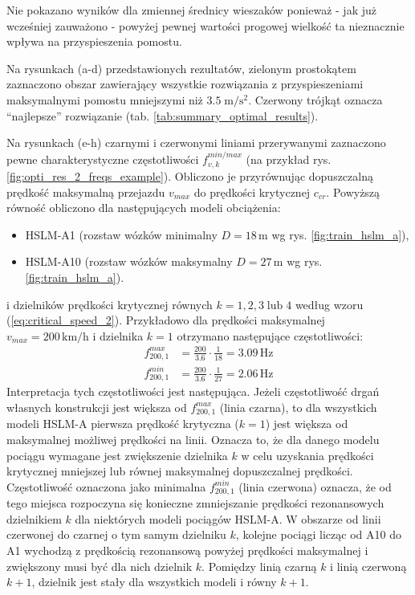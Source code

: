 Nie pokazano wyników dla zmiennej średnicy wieszaków ponieważ - jak już wcześniej zauważono - powyżej pewnej wartości progowej wielkość ta nieznacznie wpływa na przyspieszenia pomostu. 

Na rysunkach (a-d) przedstawionych rezultatów, zielonym prostokątem zaznaczono obszar zawierający wszystkie rozwiązania z przyspieszeniami maksymalnymi pomostu mniejszymi niż $3.5\;\mathrm{m/s^2}$. Czerwony trójkąt oznacza \enquote{najlepsze} rozwiązanie (tab. \ref{tab:summary_optimal_results}).

Na rysunkach (e-h) czarnymi i czerwonymi liniami przerywanymi zaznaczono pewne charakterystyczne częstotliwości $f_{v,k}^{min/max}$ (na przykład rys. \ref{fig:opti_res_2_freqs_example}). Obliczono je przyrównując dopuszczalną prędkość maksymalną przejazdu $v_{max}$ do prędkości krytycznej $c_{cr}$. Powyższą równość obliczono dla następujących modeli obciążenia:
\begin{itemize}
	\item HSLM-A1 (rozstaw wózków minimalny $D=18\,\mathrm{m}$ wg rys. \ref{fig:train_hslm_a}),
	\item HSLM-A10 (rozstaw wózków maksymalny $D=27\,\mathrm{m}$ wg rys. \ref{fig:train_hslm_a}).
\end{itemize}  
i dzielników prędkości krytycznej równych $k = 1, 2, 3\;\mathrm{lub}\;4$ według wzoru (\ref{eq:critical_speed_2}). Przykładowo dla prędkości maksymalnej $v_{max}=200\,\mathrm{km/h}$ i dzielnika $k=1$ otrzymano następujące częstotliwości:
\begin{equation*}
	\begin{split}
	f_{200,1}^{max} &= \frac{200}{3.6} \cdot \frac{1}{18}=3.09\,\mathrm{Hz} \\
	f_{200,1}^{min} &= \frac{200}{3.6} \cdot \frac{1}{27}=2.06\,\mathrm{Hz}
	\end{split}
\end{equation*} 
Interpretacja tych częstotliwości jest następująca. Jeżeli częstotliwość drgań własnych konstrukcji jest większa od $f_{200,1}^{max}$ (linia czarna), to dla wszystkich modeli HSLM-A pierwsza prędkość krytyczna ($k=1$) jest większa od maksymalnej możliwej prędkości na linii. Oznacza to, że dla danego modelu pociągu wymagane jest zwiększenie dzielnika $k$ w celu uzyskania prędkości krytycznej mniejszej lub równej maksymalnej dopuszczalnej prędkości. Częstotliwość oznaczona jako minimalna $f_{200,1}^{min}$ (linia czerwona) oznacza, że od tego miejsca rozpoczyna się konieczne zmniejszanie prędkości rezonansowych dzielnikiem $k$ dla niektórych modeli pociągów HSLM-A. W obszarze od linii czerwonej do czarnej o tym samym dzielniku $k$, kolejne pociągi licząc od A10 do A1 wychodzą z prędkością rezonansową powyżej prędkości maksymalnej i zwiększony musi być dla nich dzielnik $k$. Pomiędzy linią czarną $k$ i linią czerwoną $k+1$, dzielnik jest stały dla wszystkich modeli i równy $k+1$.


